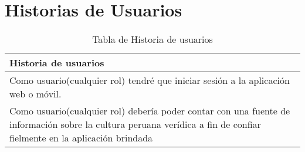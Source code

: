 \chapter{Historias de Usuarios}
\begin{table}[htbp]
	\begin{center}
		\begin{tabular}{|p{5cm}|}
			\hline
			Historia de usuarios \\
			\hline \hline
			Como usuario(cualquier rol) tendré que iniciar sesión a la aplicación web o móvil.
			\\ \hline
			Como usuario(cualquier rol) debería poder contar con una fuente de información sobre la cultura peruana verídica a fin de confiar fielmente en la aplicación brindada
			\\ \hline
			
						
		\end{tabular}
		\caption {Tabla de Historia de usuarios}
	\end{center}
\end{table}